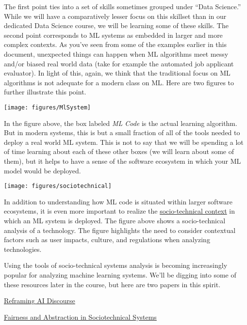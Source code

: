 \documentclass[assignment01_Solutions]{subfiles}
\begin{document}
The first point ties into a set of skills sometimes grouped under ``Data Science.''  While we will have a comparatively lesser focus on this skillset than in our dedicated Data Science course, we will be learning some of these skills.  The second point corresponds to ML systems as embedded in larger and more complex contexts.  As you've seen from some of the examples earlier in this document, unexpected things can happen when ML algorithms meet messy and/or biased real world data (take for example the automated job applicant evaluator).  In light of this, again, we think that the traditional focus on ML algorithms is not adequate for a modern class on ML.  Here are two figures to further illustrate this point.


\begin{center}
\texttt{[image: figures/MlSystem]}
\end{center}
In the figure above, the box labeled \emph{ML Code} is the actual learning algorithm.  But in modern systems, this is but a small fraction of all of the tools needed to deploy a real world ML system.  This is not to say that we will be spending a lot of time learning about each of these other boxes (we will learn about some of them), but it helps to have a sense of the software ecosystem in which your ML model would be deployed.

\begin{center}
\texttt{[image: figures/sociotechnical]}
\end{center}

In addition to understanding how ML code is situated within larger software ecosystems, it is even more important to realize the \href{https://en.wikipedia.org/wiki/Sociotechnical_system}{socio-technical context} in which an ML system is deployed.  The figure above shows a socio-technical analysis of a technology.  The figure highlights the need to consider contextual factors such as user impacts, culture, and regulations when analyzing technologies.

Using the tools of socio-technical systems analysis is becoming increasingly popular for analyzing machine learning systems.  We'll be digging into some of these resources later in the course, but here are two papers in this spirit.
\bi
\item \href{https://link.springer.com/article/10.1007/s11023-017-9417-6}{Reframing AI Discourse}
\item \href{https://dl.acm.org/citation.cfm?id=3287598}{Fairness and Abstraction in Sociotechnical Systems}
\ei
\end{document}
